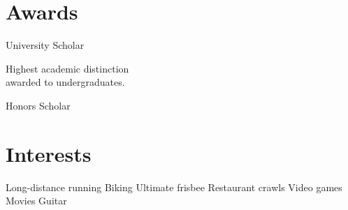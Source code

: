 \documentclass[]{deedy-resume}
\begin{document}
\begin{minipage}[t]{0.38\textwidth}

\section{Awards}
University Scholar \\
\begin{tightemize}
\item Highest academic distinction \\ awarded to undergraduates.
\end{tightemize}
Honors Scholar


\section{Interests}
Long-distance running \textbullet{} Biking \textbullet{}
Ultimate frisbee \textbullet{} Restaurant crawls \textbullet{}
Video games \textbullet{} Movies \textbullet{} Guitar

%
%

\end{minipage}
\hfill
\end{document}
